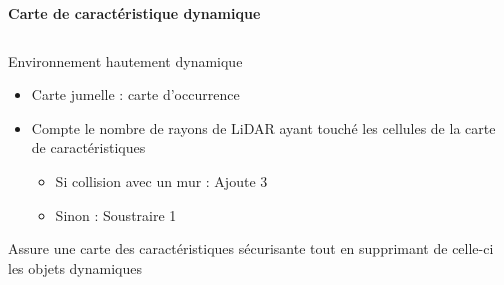\documentclass[aspectratio=169,10pt]{beamer}
\begin{document}
\begin{frame}{\textbf{Carte de caractéristique dynamique}}
	\begin{columns}
		\begin{column}{0.7\textwidth}
			Environnement hautement dynamique
			\begin{itemize}
				\item Carte jumelle : carte d'occurrence
				\item Compte le nombre de rayons de LiDAR ayant touché les cellules de la carte de caractéristiques
				\begin{itemize}
					\item Si collision avec un mur : Ajoute 3
					\item Sinon : Soustraire 1
				\end{itemize}
			\end{itemize}
			\vspace{0.5em}
			
			Assure une carte des caractéristiques sécurisante tout en supprimant de celle-ci les objets dynamiques


\end{column}
\end{columns}
\end{frame}
\end{document}
